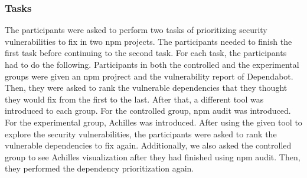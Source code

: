 \documentclass[conference]{IEEEtran}
\begin{document}
	
	
	
	\subsubsection{Tasks} 
	The participants were asked to perform two tasks of prioritizing security vulnerabilities to fix in two npm projects. The participants needed to finish the first task before continuing to the second task.
	For each task, the participants had to do the following. Participants in both the controlled and the experimental groups were given an npm projrect and the vulnerability report of Dependabot. Then, they were asked to rank the vulnerable dependencies that they thought they would fix from the first to the last. After that, a different tool was introduced to each group. For the controlled group, npm audit was introduced. For the experimental group, Achilles was introduced. After using the given tool to explore the security vulnerabilities, the participants were asked to rank the vulnerable dependencies to fix again. 
	Additionally, we also asked the controlled group to see Achilles visualization after they had finished using npm audit. Then, they performed the dependency prioritization again.
	
\end{document}
